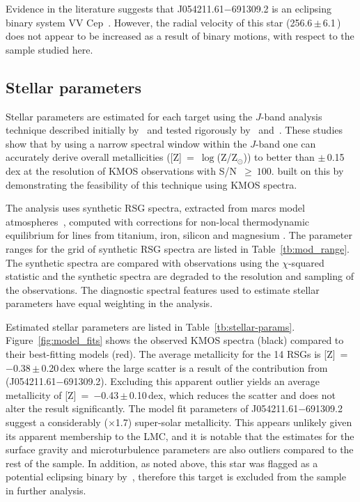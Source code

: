 Evidence in the literature suggests that J054211.61$-$691309.2 is an eclipsing binary system VV Cep~\citep{1979MNRAS.186..831F}.
However, the radial velocity of this star (256.6\,$\pm$\,6.1\,\kms) does not appear to be increased as a result of binary motions, with respect to the sample studied here.


\subsection{Stellar parameters} %
\label{sub:stellar_parameters}

Stellar parameters are estimated for each target using the $J$-band analysis technique described initially by~\cite{2010MNRAS.407.1203D}
and tested rigorously by~\cite{2014ApJ...788...58G} and~\cite{2015ApJ...806...21D}.
These studies show that by using a narrow spectral window within the $J$-band one can accurately derive overall metallicities
([Z]~=~$\log$(Z/Z$_{\odot}$)) to better than
$\pm$\,0.15\,dex at the resolution of KMOS observations with S/N~$\ge~100$.
\cite{2015ApJ...803...14P} built on this by demonstrating the feasibility of this technique using KMOS spectra.

The analysis uses synthetic RSG spectra, extracted from {\sc marcs} model atmospheres~\citep{2008A&A...486..951G},
computed with corrections for non-local thermodynamic equilibrium for lines from titanium, iron, silicon and magnesium
\citep{2012ApJ...751..156B,2013ApJ...764..115B,2015ApJ...804..113B}.
The parameter ranges for the grid of synthetic RSG spectra are listed in Table~\ref{tb:mod_range}.
The synthetic spectra are compared with observations using the $\chi$-squared statistic and the synthetic spectra are degraded to the resolution and sampling of the observations.
The diagnostic spectral features used to estimate stellar parameters have equal weighting in the analysis.


Estimated stellar parameters are listed in Table~\ref{tb:stellar-params}.
Figure~\ref{fig:model_fits} shows the observed KMOS spectra (black) compared to their best-fitting models (red).
The average metallicity for the 14 RSGs is [Z]~=~$-$0.38\,$\pm$\,0.20\,dex where the large scatter is a result of the contribution from (J054211.61$-$691309.2).
Excluding this apparent outlier yields an average metallicity of [Z]~=~$-$0.43\,$\pm$\,0.10\,dex, which reduces the scatter and does not alter the result significantly.
The model fit parameters of J054211.61$-$691309.2 suggest a considerably ($\times$1.7) super-solar
metallicity.
This appears unlikely given its apparent membership to the LMC, and it is notable that the estimates for the surface gravity and microturbulence parameters are also outliers compared to the rest of the sample.
In addition, as noted above, this star was flagged as a potential eclipsing binary by~\citep{1979MNRAS.186..831F}, therefore this target is excluded from the sample in further analysis.

